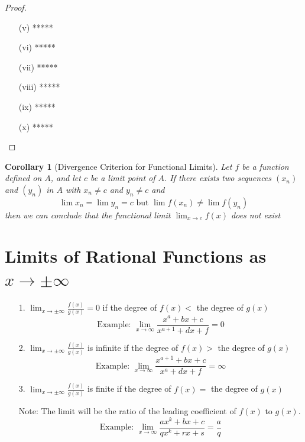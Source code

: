 \documentclass[10pt]{report}
\newtheorem{cor2}{Corollary}[section]
\newcommand{\eps}{\varepsilon}
\begin{document}
\begin{proof}
\begin{itemize}
$$\frac{1}{|Mg(x)|}=\frac{1}{|M||g(x)|}<\frac{1}{|M|}\cdot \frac{2}{|M|}=\frac{2}{M^2}$$
Also $\exists\delta_2>0\ni 0<|x-a|< \delta_2\implies |g(x)-M|<\frac{M^2}{2}\eps$\\
Let $\delta=\min\{\delta_1,\delta_2\}$. Then, for $0<|x-a|< \delta$, we have
$$\left|\frac{1}{g(x)}-\frac{1}{M} \right|=\frac{|M-g(x)|}{|Mg(x)|}<\frac{2}{M^2}\cdot \frac{M^2}{2}\eps= \eps$$
It follows that $\lim_{x\to a}\frac{1}{g(x)}=\frac{1}{M}$. Finally, using Theorem 6.3.4, we obtain
$$\lim_{x\to a}\frac{f(x)}{g(x)}=\lim_{x\to a}f(x)\left(\frac{1}{g(x)}\right)=\lim_{x\to a}f(x)\cdot \lim_{x\to a}\frac{1}{g(x)}=L\cdot\frac{1}{M}=\frac{L}{M}$$
\item[(v)] *****
\item[(vi)] *****
\item[(vii)] *****
\item[(viii)] *****
\item[(ix)] *****
\item[(x)] *****
\end{itemize}
\end{proof}
\begin{cor2}[Divergence Criterion for Functional Limits]
Let $f$ be a function defined on $A$, and let $c$ be a limit point of $A$. If there exists two sequences $(x_n)$ and $(y_n)$ in $A$ with $x_n\neq c$ and $y_n\neq c$ and 
$$\lim x_n = \lim y_n = c\text{   but   } \lim f(x_n)\neq \lim f(y_n)$$
then we can conclude that the functional limit $\lim_{x\to c}f(x)$ does not exist
\end{cor2}
\section{Limits of Rational Functions as $x\to \pm \infty$}
\begin{itemize}
\item[1.]$\lim_{x\to \pm\infty}\frac{f(x)}{g(x)} = 0$ if the degree of $f(x) <$ the degree of $g(x)$
$$\text{Example: } \lim_{x\to \infty}\frac{x^{a} + bx + c}{x^{a + 1} + dx + f} = 0$$
\item[2.]$\lim_{x\to \pm\infty}\frac{f(x)}{g(x)}$ is infinite if the degree of $f(x) >$ the degree of $g(x)$
$$\text{Example: } \lim_{x\to \infty} \frac{x^{a + 1} + bx + c}{x^{a} + dx + f} = \infty$$
\item[3.]$\lim_{x\to \pm\infty}\frac{f(x)}{g(x)}$ is finite if the degree of $f(x) =$ the degree of $g(x)$\\
\item[Note:]The limit will be the ratio of the leading coefficient of $f(x)$ to $g(x)$.
$$\text{Example: } \lim_{x\to \infty}\frac{ax^{k} + bx + c}{qx^{k} + rx + s} = \frac{a}{q}$$
\end{itemize}
\end{document}
